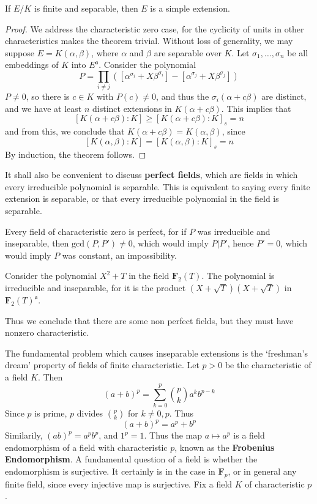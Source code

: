 \begin{corollary}
    If $E/K$ is finite and separable, then $E$ is a simple extension.
\end{corollary}
\begin{proof}
    We address the characteristic zero case, for the cyclicity of units in other characteristics makes the theorem trivial. Without loss of generality, we may suppose $E = K(\alpha, \beta)$, where $\alpha$ and $\beta$ are separable over $K$. Let $\sigma_1, \dots, \sigma_n$ be all embeddings of $K$ into $E^{\mathfrak{a}}$. Consider the polynomial
    \[ P = \prod_{i \neq j} ([\alpha^{\sigma_i} + X \beta^{\sigma_i}] - [\alpha^{\sigma_j} + X \beta^{\sigma_j}]) \]
    $P \neq 0$, so there is $c \in K$ with $P(c) \neq 0$, and thus the $\sigma_i(\alpha + c \beta)$ are distinct, and we have at least     $n$ distinct extensions in $K(\alpha + c \beta)$. This implies that
    \[ [K(\alpha + c \beta): K] \geq [K(\alpha + c \beta): K]_s = n \]
    and from this, we conclude that $K(\alpha + c \beta) = K(\alpha, \beta)$, since
    \[ [K(\alpha, \beta) : K] = [K(\alpha, \beta): K]_s = n \]
    By induction, the theorem follows.
\end{proof}

It shall also be convenient to discuss {\bf perfect fields}, which are fields in which every irreducible polynomial is separable. This is equivalent to saying every finite extension is separable, or that every irreducible polynomial in the field is separable.

\begin{example}
    Every field of characteristic zero is perfect, for if $P$ was irreducible and inseparable, then $\text{gcd}(P, P') \neq 0$, which would imply $P | P'$, hence $P' = 0$, which would imply $P$ was constant, an impossibility.
\end{example}

\begin{example}
    Consider the polynomial $X^2 + T$ in the field $\mathbf{F}_2(T)$. The polynomial is irreducible and inseparable, for it is the product $(X + \sqrt{T})(X + \sqrt{T})$ in $\mathbf{F}_2(T)^{\mathfrak{a}}$.
\end{example}

Thus we conclude that there are some non perfect fields, but they must have nonzero characteristic.

The fundamental problem which causes inseparable extensions is the `freshman's dream' property of fields of finite characteristic. Let $p > 0$ be the characteristic of a field $K$. Then
%
\[ (a + b)^p = \sum_{k = 0}^p \binom{p}{k} a^kb^{p-k} \]
%
Since $p$ is prime, $p$ divides $\binom{p}{k}$ for $k \neq 0, p$. Thus
%
\[ (a + b)^p = a^p + b^p \]
%
Similarily, $(ab)^p = a^pb^p$, and $1^p = 1$. Thus the map $a \mapsto a^p$ is a field endomorphism of a field with characteristic $p$, known as the {\bf Frobenius Endomorphism}. A fundamental question of a field is whether the endomorphism is surjective. It certainly is in the case in $\mathbf{F}_p$, or in general any finite field, since every injective map is surjective. Fix a field $K$ of characteristic $p$.

